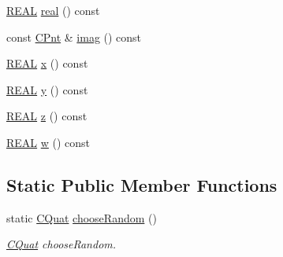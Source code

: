 \begin{DoxyCompactItemize}
\hyperlink{util_8h_a5821460e95a0800cf9f24c38915cbbde}{R\-E\-A\-L} \hyperlink{classCQuat_a7f18efa604d788a39bb6726de6546ce2}{real} () const 
\item 
const \hyperlink{classCPnt}{C\-Pnt} \& \hyperlink{classCQuat_a783b34fbc307fbb00fd112c8441b0f30}{imag} () const 
\item 
\hyperlink{util_8h_a5821460e95a0800cf9f24c38915cbbde}{R\-E\-A\-L} \hyperlink{classCQuat_ae6b5a06a27a9253ec3737101ddd02ee5}{x} () const 
\item 
\hyperlink{util_8h_a5821460e95a0800cf9f24c38915cbbde}{R\-E\-A\-L} \hyperlink{classCQuat_a01fcb600b793533c9f7554668739ac86}{y} () const 
\item 
\hyperlink{util_8h_a5821460e95a0800cf9f24c38915cbbde}{R\-E\-A\-L} \hyperlink{classCQuat_a1d2b9113413336187282a0dffcf5b39b}{z} () const 
\item 
\hyperlink{util_8h_a5821460e95a0800cf9f24c38915cbbde}{R\-E\-A\-L} \hyperlink{classCQuat_a8e83cf929e0e4f669482b419b20a096c}{w} () const 
\end{DoxyCompactItemize}
\subsection*{Static Public Member Functions}
\begin{DoxyCompactItemize}
\item 
static \hyperlink{classCQuat}{C\-Quat} \hyperlink{classCQuat_a3788f9ce393c8c6e7dc2df6e7675c594}{choose\-Random} ()
\begin{DoxyCompactList}\small\item\em \hyperlink{classCQuat}{C\-Quat} choose\-Random. \end{DoxyCompactList}\end{DoxyCompactItemize}
